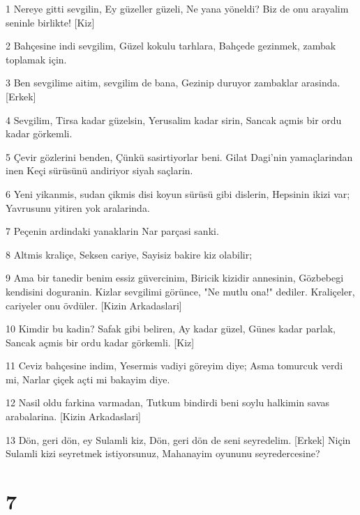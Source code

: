 \par 1 Nereye gitti sevgilin, Ey güzeller güzeli, Ne yana yöneldi? Biz de onu arayalim seninle birlikte! [Kiz]
\par 2 Bahçesine indi sevgilim, Güzel kokulu tarhlara, Bahçede gezinmek, zambak toplamak için.
\par 3 Ben sevgilime aitim, sevgilim de bana, Gezinip duruyor zambaklar arasinda. [Erkek]
\par 4 Sevgilim, Tirsa kadar güzelsin, Yerusalim kadar sirin, Sancak açmis bir ordu kadar görkemli.
\par 5 Çevir gözlerini benden, Çünkü sasirtiyorlar beni. Gilat Dagi'nin yamaçlarindan inen Keçi sürüsünü andiriyor siyah saçlarin.
\par 6 Yeni yikanmis, sudan çikmis disi koyun sürüsü gibi dislerin, Hepsinin ikizi var; Yavrusunu yitiren yok aralarinda.
\par 7 Peçenin ardindaki yanaklarin Nar parçasi sanki.
\par 8 Altmis kraliçe, Seksen cariye, Sayisiz bakire kiz olabilir;
\par 9 Ama bir tanedir benim essiz güvercinim, Biricik kizidir annesinin, Gözbebegi kendisini doguranin. Kizlar sevgilimi görünce, "Ne mutlu ona!" dediler. Kraliçeler, cariyeler onu övdüler. [Kizin Arkadaslari]
\par 10 Kimdir bu kadin? Safak gibi beliren, Ay kadar güzel, Günes kadar parlak, Sancak açmis bir ordu kadar görkemli. [Kiz]
\par 11 Ceviz bahçesine indim, Yesermis vadiyi göreyim diye; Asma tomurcuk verdi mi, Narlar çiçek açti mi bakayim diye.
\par 12 Nasil oldu farkina varmadan, Tutkum bindirdi beni soylu halkimin savas arabalarina. [Kizin Arkadaslari]
\par 13 Dön, geri dön, ey Sulamli kiz, Dön, geri dön de seni seyredelim. [Erkek] Niçin Sulamli kizi seyretmek istiyorsunuz, Mahanayim oyununu seyredercesine?

\chapter{7}

